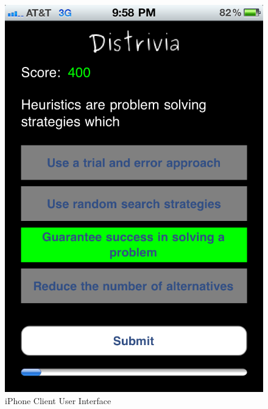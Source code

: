 \documentclass{dependencies/acm_proc_article-sp}
\begin{document}
\begin{figure}[h!]
   \includegraphics[scale=0.12]{iPhone_round.png}
   \caption{iPhone Client User Interface}
\end{figure}
\end{document}
